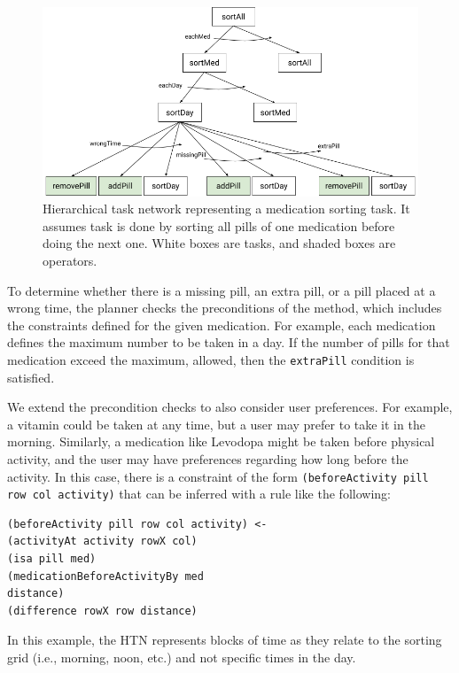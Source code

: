 \documentclass[letterpaper]{article} %
\begin{document}
\begin{figure}[h]
\centering
\includegraphics[width=0.99\columnwidth]{medsorting_htn.png}
\caption{Hierarchical task network representing a medication sorting task. It assumes task is done by sorting all pills of one medication before doing the next one. White boxes are tasks, and shaded boxes are operators.  }
\label{fig:htn}
\end{figure}

To determine whether there is a missing pill, an extra pill, or a pill placed at a wrong time, the planner %
checks the preconditions of the method, which includes the constraints defined for the given medication.  For example, each medication defines the maximum number to be taken in a day.  If the number of pills for that medication exceed the maximum, allowed, then the \texttt{extraPill} condition is satisfied.

We extend the precondition checks to also consider user preferences.
For example, a vitamin could be taken at any time, but a user may prefer to take it in the morning.  Similarly, a medication like Levodopa might be taken before physical activity, and the user may have preferences regarding how long before the activity.  In this case, there is a constraint of the form \texttt{(beforeActivity pill row col activity)} that can be inferred with a rule like the following:

\small{
\begin{verbatim}
(beforeActivity pill row col activity) <-
(activityAt activity rowX col)
(isa pill med)
(medicationBeforeActivityBy med
distance)
(difference rowX row distance)
\end{verbatim}}

In this example, the HTN represents blocks of time as they relate to the sorting grid (i.e., morning, noon, etc.) and not specific times in the day.
\end{document}
